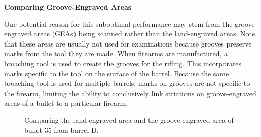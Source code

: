 \documentclass[
  12pt]{article}
\begin{document}
\textbf{Comparing Groove-Engraved Areas}

One potential reason for this suboptimal performance may stem from the
groove-engraved areas (GEAs) being scanned rather than the land-engraved
areas. Note that these areas are usually not used for examinations
because grooves preserve marks from the tool they are made. When
firearms are manufactured, a broaching tool is used to create the
grooves for the rifling. This incorporates marks specific to the tool on
the surface of the barrel. Because the same broaching tool is used for
multiple barrels, marks on grooves are not specific to the firearm,
limiting the ability to conclusively link striations on groove-engraved
areas of a bullet to a particular firearm.

\begin{figure}[H]

\begin{minipage}{0.50\linewidth}



\end{minipage}%
%
\begin{minipage}{0.50\linewidth}



\end{minipage}%

\caption{\label{fig-bulletScans}Comparing the land-engraved area and the
groove-engraved area of bullet 35 from barrel D.}

\end{figure}%
\end{document}

